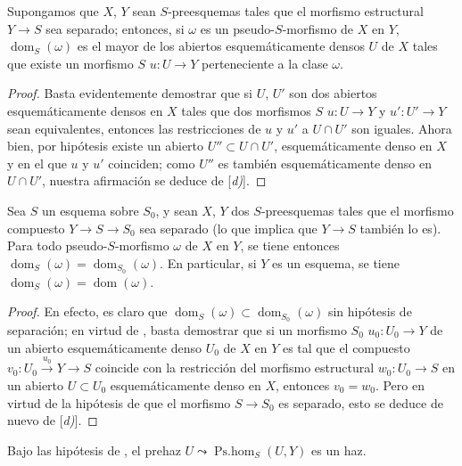 \begin{proposition}[20.2.4]
\label{IV.20.2.4}
Supongamos que $X$, $Y$ sean $S$-preesquemas tales que el morfismo estructural $Y\to S$ sea separado; entonces, si $\omega$ es un pseudo-$S$-morfismo de $X$ en $Y$, $\operatorname{dom}_S(\omega)$ es el mayor de los abiertos esquemáticamente densos $U$ de $X$ tales que existe un morfismo $S$ $u:U\to Y$ perteneciente a la clase $\omega$.
\end{proposition}

\begin{proof}
Basta evidentemente demostrar que si $U$, $U'$ son dos abiertos esquemáticamente densos en $X$ tales que dos morfismos $S$ $u:U\to Y$ y $u':U'\to Y$ sean equivalentes, entonces las restricciones de $u$ y $u'$ a $U\cap U'$ son iguales.
Ahora bien, por hipótesis existe un abierto $U''\subset U\cap U'$, esquemáticamente denso en $X$ y en el que $u$ y $u'$ coinciden; como $U''$ es también esquemáticamente denso en $U\cap U'$, nuestra afirmación se deduce de [\emph{d)}].
\end{proof}

\begin{corollary}[20.2.5]
\label{IV.20.2.5}
Sea $S$ un esquema sobre $S_0$, y sean $X$, $Y$ dos $S$-preesquemas tales que el morfismo compuesto $Y\to S\to S_0$ sea separado (lo que implica  que $Y\to S$ también lo es).
Para todo pseudo-$S$-morfismo $\omega$ de $X$ en $Y$, se tiene entonces $\operatorname{dom}_S(\omega)=\operatorname{dom}_{S_0}(\omega)$.
En particular, si $Y$ es un esquema, se tiene $\operatorname{dom}_S(\omega)=\operatorname{dom}(\omega)$.
\end{corollary}

\begin{proof}
En efecto, es claro que $\operatorname{dom}_S(\omega)\subset\operatorname{dom}_{S_0}(\omega)$ sin hipótesis de separación; en virtud de , basta demostrar que si un morfismo $S_0$ $u_0:U_0\to Y$ de un abierto
esquemáticamente denso $U_0$ de $X$ en $Y$ es tal que el compuesto $v_0:U_0\xrightarrow{u_0}Y\to S$ coincide con la restricción del morfismo estructural $w_0:U_0\to S$ en un abierto $U\subset U_0$ esquemáticamente denso en $X$, entonces $v_0=w_0$.
Pero en virtud de la hipótesis de que el morfismo $S\to S_0$ es separado, esto se deduce de nuevo de [\emph{d)}].
\end{proof}

\begin{corollary}[20.2.6]
\label{IV.20.2.6}
Bajo las hipótesis de , el prehaz $U\leadsto\operatorname{Ps.hom}_S(U,Y)$ es un haz.
\end{corollary}

